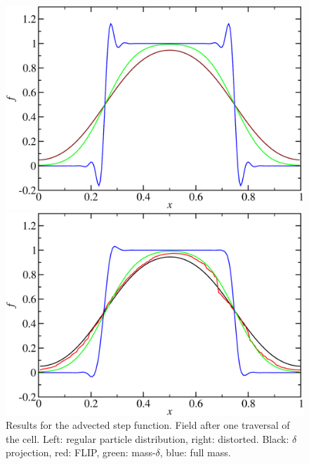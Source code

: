 \documentclass{ws-ijcm}
\begin{document}
\begin{figure}
  \centering
  \begin{minipage}{0.45\textwidth}
      \includegraphics[width=\textwidth]{1D_final}
  \end{minipage}
  \quad
  \begin{minipage}{0.45\textwidth}
      \includegraphics[width=\textwidth]{1D_final_pert}
  \end{minipage}
  \caption{Results for the advected step function. Field after one
    traversal of the cell. Left: regular particle distribution, right:
    distorted. Black: $\delta$ projection, red: FLIP, green:
    mass-$\delta$, blue: full mass. \label{fig:1D_final}}
\end{figure}
\end{document}
